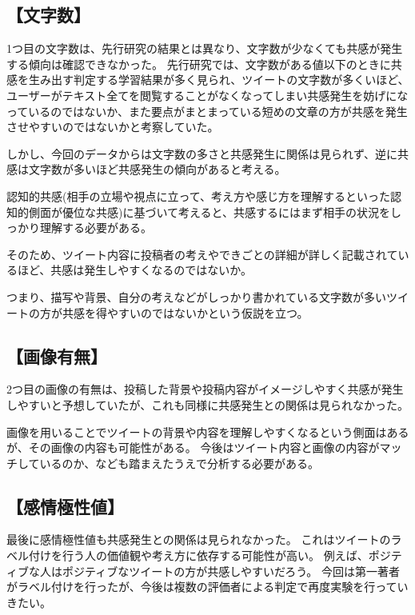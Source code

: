 \documentclass[dvipdfmx]{issj}
\begin{document}
\subsection{【文字数】}  %
1つ目の文字数は、先行研究の結果とは異なり、文字数が少なくても共感が発生する傾向は確認できなかった。
先行研究では、文字数がある値以下のときに共感を生み出す判定する学習結果が多く見られ、ツイートの文字数が多くいほど、ユーザーがテキスト全てを閲覧することがなくなってしまい共感発生を妨げになっているのではないか、また要点がまとまっている短めの文章の方が共感を発生させやすいのではないかと考察していた。

しかし、今回のデータからは文字数の多さと共感発生に関係は見られず、逆に共感は文字数が多いほど共感発生の傾向があると考える。

認知的共感(相手の立場や視点に立って、考え方や感じ方を理解するといった認知的側面が優位な共感)に基づいて考えると、共感するにはまず相手の状況をしっかり理解する必要がある。

そのため、ツイート内容に投稿者の考えやできごとの詳細が詳しく記載されているほど、共感は発生しやすくなるのではないか。

つまり、描写や背景、自分の考えなどがしっかり書かれている文字数が多いツイートの方が共感を得やすいのではないかという仮説を立つ。

\subsection{【画像有無】}  %
2つ目の画像の有無は、投稿した背景や投稿内容がイメージしやすく共感が発生しやすいと予想していたが、これも同様に共感発生との関係は見られなかった。

画像を用いることでツイートの背景や内容を理解しやすくなるという側面はあるが、その画像の内容も可能性がある。
今後はツイート内容と画像の内容がマッチしているのか、なども踏まえたうえで分析する必要がある。

\subsection{【感情極性値】}  %
最後に感情極性値も共感発生との関係は見られなかった。
これはツイートのラベル付けを行う人の価値観や考え方に依存する可能性が高い。
例えば、ポジティブな人はポジティブなツイートの方が共感しやすいだろう。
今回は第一著者がラベル付けを行ったが、今後は複数の評価者による判定で再度実験を行っていきたい。
\end{document}
